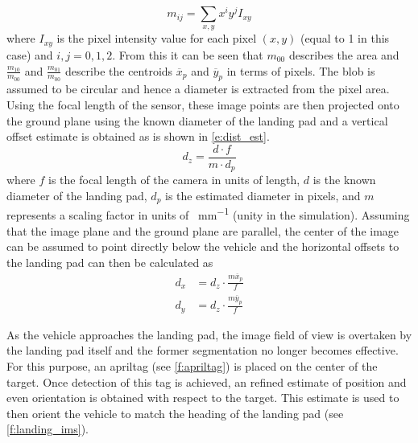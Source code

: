 \documentclass[]{aiaa-tc}
\begin{document}
\begin{equation}\label{e:im_moments}
m_{ij}=\sum_{x,y}x^iy^jI_{xy}
\end{equation}
where $I_{xy}$ is the pixel intensity value for each pixel $(x,y)$ (equal to 1 in this case) and $i,j = 0,1,2$. From this it can be seen that $m_{00}$ describes the area and $\frac{m_{10}}{m_{00}}$ and $\frac{m_{01}}{m_{00}}$ describe the centroids $\overline{x}_p$ and $\overline{y}_p$ in terms of pixels. The blob is assumed to be circular and hence a diameter is extracted from the pixel area. Using the focal length of the sensor, these image points are then projected onto the ground plane using the known diameter of the landing pad and a vertical offset estimate is obtained as is shown in \cref{e:dist_est}.
\begin{equation}\label{e:dist_est}
d_z=\frac{d\cdot f}{m\cdot d_p}
\end{equation}
where $f$ is the focal length of the camera in units of length, $d$ is the known diameter of the landing pad, $d_p$ is the estimated diameter in pixels, and $m$ represents a scaling factor in units of \si{\px\per\mm} (unity in the simulation).
Assuming that the image plane and the ground plane are parallel, the center of the image can be assumed to point directly below the vehicle and the horizontal offsets to the landing pad can then be calculated as
\begin{align}\label{e:horiz_est}
d_x &= d_z\cdot\frac{m\overline{x}_p}{f}\\
d_y &= d_z\cdot\frac{m\overline{y}_p}{f}
\end{align}

As the vehicle approaches the landing pad, the image field of view is overtaken by the landing pad itself and the former segmentation no longer becomes effective. For this purpose, an apriltag\cite{olson2011tags} (see \cref{f:apriltag}) is placed on the center of the target. Once detection of this tag is achieved, an refined estimate of position and even orientation is obtained with respect to the target. This estimate is used to then orient the vehicle to match the heading of the landing pad (see \cref{f:landing_ims}).
\end{document}

